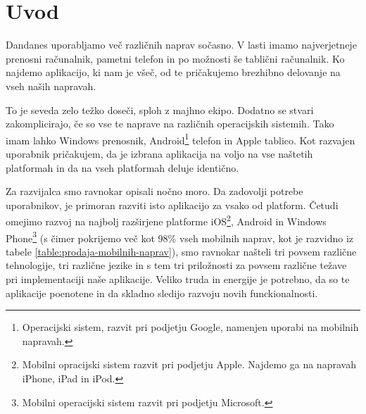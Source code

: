 \graphicspath{{img/}}





\chapter{Uvod}
\label{chap:introduction}


Dandanes uporabljamo več različnih naprav sočasno. V lasti imamo najverjetneje prenosni računalnik, pametni telefon in po možnosti še tablični računalnik. Ko najdemo aplikacijo, ki nam je všeč, od te pričakujemo brezhibno delovanje na vseh naših napravah.

To je seveda zelo težko doseči, sploh z majhno ekipo. Dodatno se stvari zakomplicirajo, če so vse te naprave na različnih operacijskih sistemih. Tako imam lahko Windows prenosnik, Android\footnote{Operacijski sistem, razvit pri podjetju Google, namenjen uporabi na mobilnih napravah.} telefon in Apple tablico. Kot razvajen uporabnik pričakujem, da je izbrana aplikacija na voljo na vse naštetih platformah in da na vseh platformah deluje identično.

Za razvijalca smo ravnokar opisali nočno moro. Da zadovolji potrebe uporabnikov, je primoran razviti isto aplikacijo za vsako od platform. Četudi omejimo razvoj na najbolj razširjene platforme iOS\footnote{Mobilni opracijski sistem razvit pri podjetju Apple. Najdemo ga na napravah iPhone, iPad in iPod.}, Android in Windows Phone\footnote{Mobilni operacijski sistem razvit pri podjetju Microsoft.} (s čimer pokrijemo več kot 98\% vseh mobilnih naprav, kot je razvidno iz tabele \ref{table:prodaja-mobilnih-naprav}), smo ravnokar našteli tri povsem različne tehnologije, tri različne jezike in s tem tri priložnosti za povsem različne težave pri implementaciji naše aplikacije. Veliko truda in energije je potrebno, da so te aplikacije poenotene in da skladno sledijo razvoju novih funckionalnosti.

